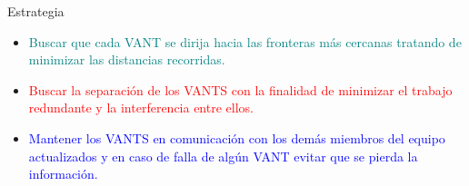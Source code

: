 \documentclass[
  24pt, %
  aspectratio=169, %
]{beamer}
\begin{document}
\begin{frame}{Estrategia}
  
  \begin{minipage}{0.67\textwidth}
    \begin{itemize}
    \item[] \textcolor{teal}{Buscar que cada VANT se dirija hacia las fronteras más cercanas tratando de minimizar las distancias recorridas.}
      \bigskip %
    \item[] \textcolor{red}{Buscar la separación de los VANTS con la finalidad de minimizar el trabajo redundante y la interferencia entre ellos.}
      \bigskip %
    \item[] \textcolor{blue}{Mantener los VANTS en comunicación con los demás miembros del equipo actualizados y en caso de falla de algún VANT evitar que se pierda la información.}
    \end{itemize}
  \end{minipage}
  \hspace{0.6cm}
  \begin{minipage}{0.2\textwidth}

\end{minipage}
\end{frame}
\end{document}

